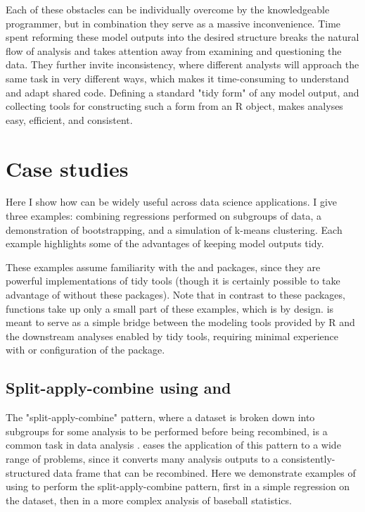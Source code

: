 Each of these obstacles can be individually overcome by the knowledgeable programmer, but in combination they serve as a massive inconvenience. Time spent reforming these model outputs into the desired structure breaks the natural flow of analysis and takes attention away from examining and questioning the data. They further invite inconsistency, where different analysts will approach the same task in very different ways, which makes it time-consuming to understand and adapt shared code. Defining a standard "tidy form" of any model output, and collecting tools for constructing such a form from an R object, makes analyses easy, efficient, and consistent.

\section{Case studies}

Here I show how  can be widely useful across data science applications. I give three examples: combining regressions performed on subgroups of data, a demonstration of bootstrapping, and a simulation of k-means clustering. Each example highlights some of the advantages of keeping model outputs tidy.

These examples assume familiarity with the  and  packages, since they are powerful implementations of tidy tools (though it is certainly possible to take advantage of  without these packages). Note that in contrast to these packages,  functions take up only a small part of these examples, which is by design.  is meant to serve as a simple bridge between the modeling tools provided by R and the downstream analyses enabled by tidy tools, requiring minimal experience with or configuration of the package.

\subsection{Split-apply-combine using  and }

\label{sec:split_apply_combine}

The "split-apply-combine" pattern, where a dataset is broken down into subgroups for some analysis to be performed before being recombined, is a common task in data analysis \citep{Wickham:2011}.  eases the application of this pattern to a wide range of problems, since it converts many analysis outputs to a consistently-structured data frame that can be recombined. Here we demonstrate examples of using  to perform the split-apply-combine pattern, first in a simple regression on the  dataset, then in a more complex analysis of baseball statistics.

